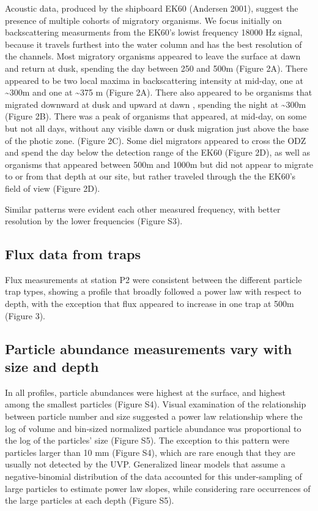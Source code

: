 \documentclass[]{article}
\begin{document}
Acoustic data, produced by the shipboard EK60 (Andersen 2001), suggest
the presence of multiple cohorts of migratory organisms. We focus
initially on backscattering measurments from the EK60's lowist frequency
18000 Hz signal, because it travels furthest into the water column and
has the best resolution of the channels. Most migratory organisms
appeared to leave the surface at dawn and return at dusk, spending the
day between 250 and 500m (Figure 2A). There appeared to be two local
maxima in backscattering intensity at mid-day, one at
\textasciitilde{}300m and one at \textasciitilde{}375 m (Figure 2A).
There also appeared to be organisms that migrated downward at dusk and
upward at dawn , spending the night at \textasciitilde{}300m (Figure
2B). There was a peak of organisms that appeared, at mid-day, on some
but not all days, without any visible dawn or dusk migration just above
the base of the photic zone. (Figure 2C). Some diel migrators appeared
to cross the ODZ and spend the day below the detection range of the EK60
(Figure 2D), as well as organisms that appeared between 500m and 1000m
but did not appear to migrate to or from that depth at our site, but
rather traveled through the the EK60's field of view (Figure 2D).

Similar patterns were evident each other measured frequency, with better
resolution by the lower frequencies (Figure S3).

\hypertarget{flux-data-from-traps}{%
\subsection{Flux data from traps}\label{flux-data-from-traps}}

Flux measurements at station P2 were consistent between the different
particle trap types, showing a profile that broadly followed a power law
with respect to depth, with the exception that flux appeared to increase
in one trap at 500m (Figure 3).

\hypertarget{particle-abundance-measurements-vary-with-size-and-depth}{%
\subsection{Particle abundance measurements vary with size and
depth}\label{particle-abundance-measurements-vary-with-size-and-depth}}

In all profiles, particle abundances were highest at the surface, and
highest among the smallest particles (Figure S4). Visual examination of
the relationship between particle number and size suggested a power law
relationship where the log of volume and bin-sized normalized particle
abundance was proportional to the log of the particles' size (Figure
S5). The exception to this pattern were particles larger than 10 mm
(Figure S4), which are rare enough that they are usually not detected by
the UVP. Generalized linear models that assume a negative-binomial
distribution of the data accounted for this under-sampling of large
particles to estimate power law slopes, while considering rare
occurrences of the large particles at each depth (Figure S5).
\end{document}
